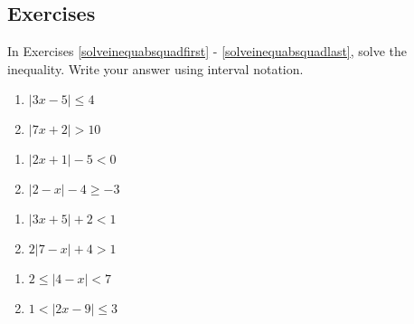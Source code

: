 \newpage

\subsection{Exercises}

In Exercises \ref{solveinequabsquadfirst} - \ref{solveinequabsquadlast}, solve the inequality.  Write your answer using interval notation. 

\begin{multicols}{2}
\begin{enumerate}

\item $|3x - 5| \leq 4$ \label{solveinequabsquadfirst}
\item $|7x + 2| > 10$

\setcounter{HW}{\value{enumi}}
\end{enumerate}
\end{multicols}

\begin{multicols}{2}
\begin{enumerate}
\setcounter{enumi}{\value{HW}}

\item $|2x+1| - 5 < 0$   
\item $|2-x| - 4 \geq -3$

\setcounter{HW}{\value{enumi}}
\end{enumerate}
\end{multicols}

\begin{multicols}{2}
\begin{enumerate}
\setcounter{enumi}{\value{HW}}

\item $|3x+5| + 2 < 1$   
\item $2|7-x| +4 > 1$

\setcounter{HW}{\value{enumi}}
\end{enumerate}
\end{multicols}

\begin{multicols}{2}
\begin{enumerate}
\setcounter{enumi}{\value{HW}}

\item  $2 \leq |4-x| < 7$ 
\item $1 < |2x - 9| \leq 3$

\setcounter{HW}{\value{enumi}}
\end{enumerate}
\end{multicols}

